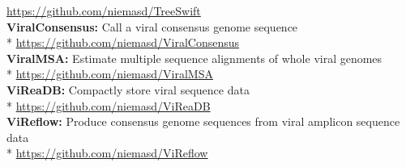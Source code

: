 \documentclass[margin,line]{res}
\begin{document}
\begin{resume}
\hspace*{4mm} \href{https://github.com/niemasd/TreeSwift}{https://github.com/niemasd/TreeSwift}\\
\textbf{ViralConsensus:} Call a viral consensus genome sequence\\*\vspace{2mm}
\hspace*{4mm} \href{https://github.com/niemasd/ViralConsensus}{https://github.com/niemasd/ViralConsensus}\\
\textbf{ViralMSA:} Estimate multiple sequence alignments of whole viral genomes\\*\vspace{2mm}
\hspace*{4mm} \href{https://github.com/niemasd/ViralMSA}{https://github.com/niemasd/ViralMSA}\\
\textbf{ViReaDB:} Compactly store viral sequence data\\*\vspace{2mm}
\hspace*{4mm} \href{https://github.com/niemasd/ViReaDB}{https://github.com/niemasd/ViReaDB}\\
\textbf{ViReflow:} Produce consensus genome sequences from viral amplicon sequence data\\*\vspace{2mm}
\hspace*{4mm} \href{https://github.com/niemasd/ViralMSA}{https://github.com/niemasd/ViReflow}\\


\end{resume}
\end{document}
